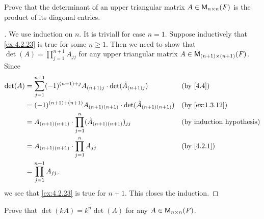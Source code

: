 \exercisesection

\setcounter{ex}{22}
\begin{ex}\label{ex:4.2.23}
	Prove that the determinant of an upper triangular matrix \(A \in \mathsf{M}_{{n} \times n}({\mathit{F}})\) is the product of its diagonal entries.
\end{ex}

\begin{proof}[]
	We use induction on \(n\).
	It is triviall for case \(n = 1\).
	Suppose inductively that \cref{ex:4.2.23} is true for some \(n \geq 1\).
	Then we need to show that \(\det(A) = \prod_{j = 1}^{n + 1} A_{j j}\) for any upper triangular matrix \(A \in \mathsf{M}_{{(n + 1)} \times (n + 1)}({\mathit{F}})\).
	Since
	\begin{align*}
		\det(A) & = \sum_{j = 1}^{n + 1} (-1)^{(n + 1) + j} A_{(n + 1) j} \cdot \det(\tilde{A}_{(n + 1) j}) &  & \by{4.4}                         \\
		        & = (-1)^{(n + 1) + (n + 1)} A_{(n + 1) (n + 1)} \cdot \det(\tilde{A}_{(n + 1) (n + 1)})    &  & \by{ex:1.3.12}                   \\
		        & = A_{(n + 1) (n + 1)} \cdot \prod_{j = 1}^n (\tilde{A}_{(n + 1) (n + 1)})_{j j}           &  & \text{(by induction hypothesis)} \\
		        & = A_{(n + 1) (n + 1)} \cdot \prod_{j = 1}^n A_{j j}                                       &  & \by{4.2.1}                       \\
		        & = \prod_{j = 1}^{n + 1} A_{j j},
	\end{align*}
	we see that \cref{ex:4.2.23} is true for \(n + 1\).
	This closes the induction.
\end{proof}

\setcounter{ex}{24}
\begin{ex}\label{ex:4.2.25}
	Prove that \(\det(kA) = k^n \det(A)\) for any \(A \in \mathsf{M}_{{n} \times n}({\mathit{F}})\).
\end{ex}

